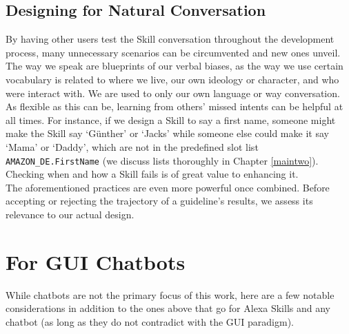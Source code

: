 \subsection*{Designing for Natural Conversation}
By having other users test the Skill conversation throughout the development process, many unnecessary scenarios can be circumvented and new ones unveil. The way we speak are blueprints of our verbal biases, as the way we use certain vocabulary is related to where we live, our own ideology or character, and who were interact with. We are used to only our own language or way conversation. As flexible as this can be, learning from others' missed intents can be helpful at all times. For instance, if we design a Skill to say a first name, someone might make the Skill say `Günther' or `Jacks' while someone else could make it say `Mama' or `Daddy', which are not in the predefined slot list \texttt{AMAZON_DE.FirstName} (we discuss lists thoroughly in Chapter \ref{maintwo}). Checking when and how a Skill fails is of great value to enhancing it.\\


The aforementioned practices are even more powerful once combined. Before accepting or rejecting the trajectory of a guideline's results, we assess its relevance to our actual design.






\section{For GUI Chatbots}





While chatbots are not the primary focus of this work, here are a few notable considerations in addition to the ones above that go for Alexa Skills and any chatbot (as long as they do not contradict with the GUI paradigm).




